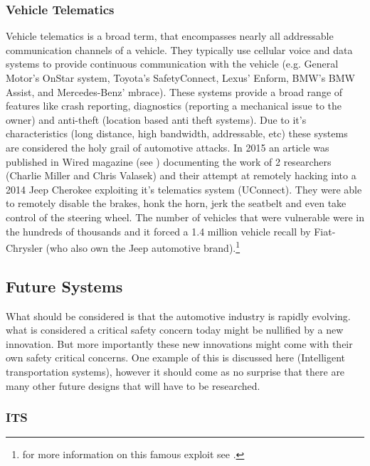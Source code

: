 \subsubsection{Vehicle Telematics} 
\label{subsubsec:telematics}

Vehicle telematics is a broad term, that encompasses nearly all addressable communication channels of a vehicle. They typically use cellular voice and data systems to provide continuous communication with the vehicle (e.g. General Motor's OnStar system, Toyota's SafetyConnect, Lexus' Enform, BMW's BMW Assist, and Mercedes-Benz' mbrace). These systems provide a broad range of features like crash reporting, diagnostics (reporting a mechanical issue to the owner) and anti-theft (location based anti theft systems)\cite{Kosher}. Due to it's characteristics (long distance, high bandwidth, addressable, etc) these systems are considered the holy grail of automotive attacks\cite{MillerA}. In 2015 an article was published in Wired magazine (see \cite{Wired}) documenting the work of 2 researchers (Charlie Miller and Chris Valasek) and their attempt at remotely hacking into a 2014 Jeep Cherokee exploiting it's telematics system (UConnect). They were able to remotely disable the brakes, honk the horn, jerk the seatbelt and even take control of the steering wheel\cite{Wired}. The number of vehicles that were vulnerable were in the hundreds of thousands and it forced a 1.4 million vehicle recall by Fiat-Chrysler (who also own the Jeep automotive brand).\footnote{for more information on this famous exploit see \cite{MillerD}.}

\subsection{Future Systems}
\label{subsec:future_systems}

What should be considered is that the automotive industry is rapidly evolving. what is considered a critical safety concern today might be nullified by a new innovation. But more importantly these new innovations might come with their own safety critical concerns. One example of this is discussed here (Intelligent transportation systems), however it should come as no surprise that there are many other future designs that will have to be researched.

\subsubsection{ITS} 
\label{subsubsec:its}

